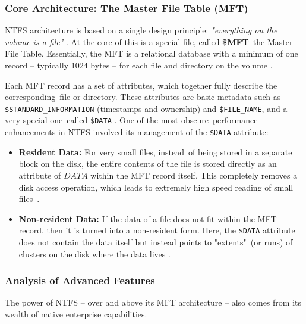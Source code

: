 \documentclass[12pt]{article}
\begin{document}
\subsubsection{Core Architecture: The Master File Table (MFT)}
NTFS architecture is based on a single design principle:  \textit{"everything on the volume is a file"} \parencite{Shafiei2012}. At the core of this is a special file, called \textbf{\$MFT} the Master File Table. Essentially, the MFT is a relational database with a minimum of one record -- typically 1024 bytes -- for each file and directory on the volume \parencite{HarvardCS161Journaling}.

Each MFT record has a set of attributes, which together fully describe the corresponding file or directory. These attributes are basic metadata such as \texttt{\$STANDARD\_INFORMATION} (timestamps and ownership) and \texttt{\$FILE\_NAME}, and a very special one called \texttt{\$DATA} \parencite{Shafiei2012}. One of the most obscure performance enhancements in NTFS involved its management of the \texttt{\$DATA} attribute:

\begin{itemize}
    \item \textbf{Resident Data:} For very small files, instead of being stored in a separate block on the disk, the entire contents of the file is stored directly as an attribute of $DATA$ within the MFT record itself. This completely removes a disk access operation, which leads to extremely high speed reading of small files \parencite{CIRCL2023}.
    
    \item \textbf{Non-resident Data:} If the data of a file does not fit within the MFT record, then it is turned into a non-resident form. Here, the \texttt{\$DATA} attribute does not contain the data itself but instead points to "extents" (or runs) of clusters on the disk where the data lives \parencite{HarvardCS161Journaling}.
\end{itemize}

\subsubsection{Analysis of Advanced Features}
The power of NTFS – over and above its MFT architecture – also comes from its wealth of native enterprise capabilities.
\end{document}
